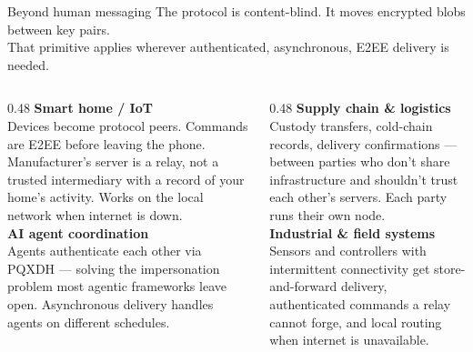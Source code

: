 \documentclass[aspectratio=169, 11pt]{beamer}
\begin{document}
\begin{frame}{Beyond human messaging}
\vspace{2mm}
The protocol is content-blind. It moves encrypted blobs between key pairs.\\
\small\color{mwgray}That primitive applies wherever authenticated, asynchronous, E2EE delivery is needed.\normalcolor
\vspace{4mm}

\begin{columns}[T]
  \begin{column}{0.48\textwidth}
    {\color{mwaccent}\textbf{Smart home / IoT}}\\
    \small Devices become protocol peers. Commands are E2EE before leaving the phone.
    Manufacturer's server is a relay, not a trusted intermediary with a record of your home's activity.
    Works on the local network when internet is down.\\[6pt]

    {\color{mwaccent}\textbf{AI agent coordination}}\\
    \small Agents authenticate each other via PQXDH — solving the impersonation problem
    most agentic frameworks leave open. Asynchronous delivery handles agents on different schedules.
  \end{column}
  \begin{column}{0.48\textwidth}
    {\color{mwaccent}\textbf{Supply chain \& logistics}}\\
    \small Custody transfers, cold-chain records, delivery confirmations — between parties
    who don't share infrastructure and shouldn't trust each other's servers.
    Each party runs their own node.\\[6pt]

    {\color{mwaccent}\textbf{Industrial \& field systems}}\\
    \small Sensors and controllers with intermittent connectivity get store-and-forward delivery,
    authenticated commands a relay cannot forge, and local routing when internet is unavailable.
  \end{column}
\end{columns}
\end{frame}
\end{document}
